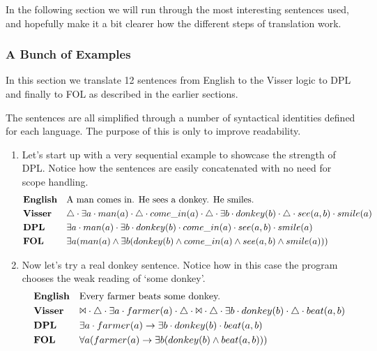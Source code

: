 \documentclass[12pt]{article}
\begin{document}
In the following section we will run through the most interesting sentences used, and hopefully make it a bit clearer how the different steps of translation work.

\subsubsection{A Bunch of Examples}

In this section we translate 12 sentences from English to the Visser logic to DPL and finally to FOL as described in the earlier sections.

The sentences are all simplified through a number of syntactical identities defined for each language. The purpose of this is only to improve readability.

\begin{enumerate}
\item
Let's start up with a very sequential example to showcase the strength of DPL. Notice how the sentences are easily concatenated with no need for scope handling.
\begin{align*}
&\text{\textbf{English}}&&\text{A man comes in. He sees a donkey. He smiles.} \\
&\text{\textbf{Visser}}&&\triangle \cdot \exists a \cdot man(a) \cdot \triangle \cdot come\_in(a) \cdot \triangle \cdot \exists b \cdot donkey(b) \cdot \triangle \cdot see(a,b) \cdot smile(a) \\
&\text{\textbf{DPL}}&&\exists a \cdot man(a) \cdot \exists b \cdot donkey(b) \cdot come\_in(a) \cdot see(a,b) \cdot smile(a) \\
&\text{\textbf{FOL}}&&\exists a(man(a) \wedge \exists b(donkey(b) \wedge come\_in(a) \wedge see(a,b) \wedge smile(a))) \\
\end{align*}
\item
Now let's try a real donkey sentence. Notice how in this case the program chooses the weak reading of `some donkey'.
\begin{align*}
&\text{\textbf{English}}&&\text{Every farmer beats some donkey.} \\
&\text{\textbf{Visser}}&&\Bowtie \cdot \triangle \cdot \exists a \cdot farmer(a) \cdot \triangle \cdot \Bowtie \cdot \triangle \cdot \exists b \cdot donkey(b) \cdot \triangle \cdot beat(a,b) \\
&\text{\textbf{DPL}}&&\exists a \cdot farmer(a) \rightarrow \exists b \cdot donkey(b) \cdot beat(a,b) \\
&\text{\textbf{FOL}}&&\forall a(farmer(a) \rightarrow \exists b(donkey(b) \wedge beat(a,b))) \\

\end{align*}
\end{enumerate}
\end{document}
